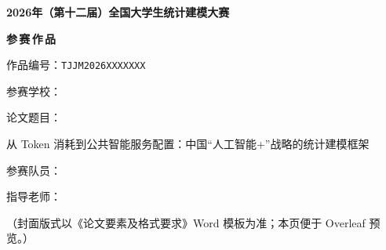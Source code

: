 


\begin{titlepage}
  \centering
  \vspace*{0.5cm}
  {\large\bfseries 2026年（第十二届）全国大学生统计建模大赛\par}
  \vspace{1.2cm}
  {\LARGE\bfseries 参\,赛\,作\,品\par}
  \vspace{2cm}

  {\heiti 作品编号：\texttt{TJJM2026XXXXXXX}\par}
  \vspace{1.5em}
  {\heiti 参赛学校：\underline{\makebox[10cm][c]{}} \par}
  \vspace{1em}
  {\heiti 论文题目：\par}
  \vspace{0.5em}
  {\fangsong
    从 Token 消耗到公共智能服务配置：中国“人工智能+”战略的统计建模框架\par}
  \vspace{1.5em}
  {\heiti 参赛队员：\underline{\makebox[10cm][c]{}} \par}
  \vspace{1em}
  {\heiti 指导老师：\underline{\makebox[10cm][c]{}} \par}

  \vfill
  {\songti （封面版式以《论文要素及格式要求》Word 模板为准；本页便于 Overleaf 预览。）\par}
\end{titlepage}

\clearpage
\setcounter{page}{1}



\clearpage
\tableofcontents

\clearpage
\listoffigures
{}

\clearpage
\listoftables
{}

\clearpage


\clearpage



